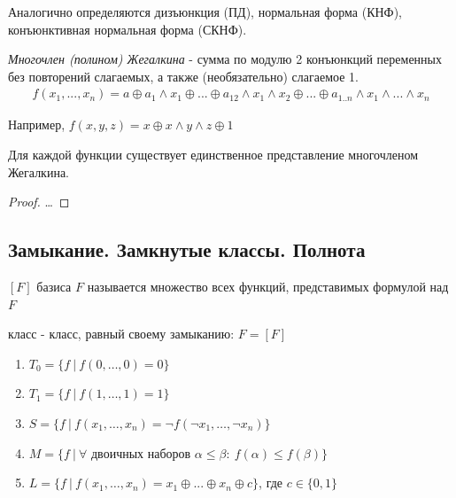 \documentclass[a4paper, 14pt]{article}
\begin{document}
    Аналогично определяются { дизъюнкция} (ПД), { нормальная форма} (КНФ),
    { конъюнктивная нормальная форма} (СКНФ).

    \begin{definition}
        {\it Многочлен (полином) Жегалкина} - сумма по модулю 2 конъюнкций переменных
        без повторений слагаемых, а также (необязательно) слагаемое 1.
        \begin{align*}
            f(x_1, ..., x_n) = a \oplus a_1 \wedge x_1 \oplus ... \oplus 
            a_{12} \wedge x_1 \wedge x_2 
            \oplus ... \oplus a_{1..n} \wedge x_1 \wedge ... \wedge x_n
        \end{align*}
    \end{definition}

    Например, $f(x, y, z) = x \oplus x \wedge y \wedge z \oplus 1$ 

    \begin{theorem}
        Для каждой функции существует единственное представление многочленом Жегалкина.
    \end{theorem}
    \begin{proof}
        \dots
    \end{proof}
    
    \subsection*{Замыкание. Замкнутые классы. Полнота}
    
    \begin{definition}
        { $[F]$} базиса $F$ называется множество всех
        функций, представимых формулой над $F$
    \end{definition}
    \begin{definition}
        { класс} - класс, равный своему замыканию: $F = [F]$
    \end{definition}

    \begin{enumerate}
        \item $T_0 = \{f \ \vert \ f(0, \dots, 0) = 0\}$
        \item $T_1 = \{f \ \vert \ f(1, \dots, 1) = 1\}$
        \item $S = \{f \ \vert \ f(x_1, \dots, x_n) = \lnot f(\lnot x_1, \dots, \lnot x_n)\}$
        \item $M = \{f \ \vert \ \forall \text{ двоичных наборов } \alpha \leq \beta: \
        f(\alpha) \leq f(\beta)\}$
        \item $L = \{f \ \vert \ f(x_1, \dots, x_n) = x_1 \oplus ... \oplus x_n \oplus c\}$, где $c \in \{0, 1\}$
    \end{enumerate}
    
\end{document}
